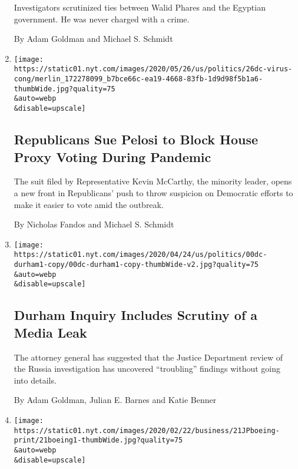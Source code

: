 \begin{enumerate}
  Investigators scrutinized ties between Walid Phares and the Egyptian
  government. He was never charged with a crime.

  By Adam Goldman and Michael S. Schmidt
\item
  \href{/2020/05/26/us/politics/house-lawsuit-proxy-voting-coronavirus.html}{}

  \texttt{[image: https://static01.nyt.com/images/2020/05/26/us/politics/26dc-virus-cong/merlin\_172278099\_b7bce66c-ea19-4668-83fb-1d9d98f5b1a6-thumbWide.jpg?quality=75\\\&auto=webp\\\&disable=upscale]}

  \hypertarget{republicans-sue-pelosi-to-block-house-proxy-voting-during-pandemic}{%
  \subsection{Republicans Sue Pelosi to Block House Proxy Voting During
  Pandemic}\label{republicans-sue-pelosi-to-block-house-proxy-voting-during-pandemic}}

  The suit filed by Representative Kevin McCarthy, the minority leader,
  opens a new front in Republicans' push to throw suspicion on
  Democratic efforts to make it easier to vote amid the outbreak.

  By Nicholas Fandos and Michael S. Schmidt
\item
  \href{/2020/04/24/us/politics/john-durham-ignatius-column.html}{}

  \texttt{[image: https://static01.nyt.com/images/2020/04/24/us/politics/00dc-durham1-copy/00dc-durham1-copy-thumbWide-v2.jpg?quality=75\\\&auto=webp\\\&disable=upscale]}

  \hypertarget{durham-inquiry-includes-scrutiny-of-a-media-leak}{%
  \subsection{Durham Inquiry Includes Scrutiny of a Media
  Leak}\label{durham-inquiry-includes-scrutiny-of-a-media-leak}}

  The attorney general has suggested that the Justice Department review
  of the Russia investigation has uncovered ``troubling'' findings
  without going into details.

  By Adam Goldman, Julian E. Barnes and Katie Benner
\item
  \href{/2020/02/21/business/boeing-737-max-investigation.html}{}

  \texttt{[image: https://static01.nyt.com/images/2020/02/22/business/21JPboeing-print/21boeing1-thumbWide.jpg?quality=75\\\&auto=webp\\\&disable=upscale]}


\end{enumerate}
